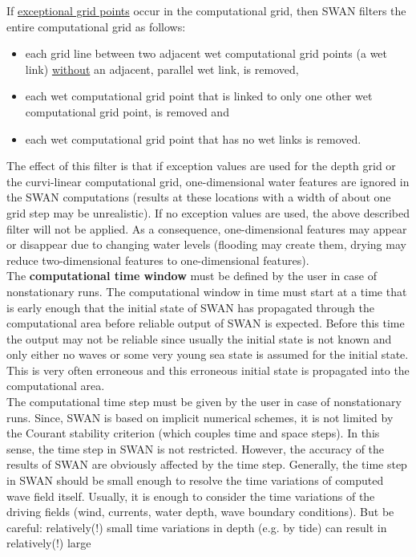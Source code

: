 \documentclass[12pt]{book}
\begin{document}
If \underline{exceptional grid points} occur in the computational grid, then SWAN filters the entire computational grid
as follows:
\begin{itemize}
  \item each grid line between two adjacent wet computational grid points (a wet link) \underline{without} an
        adjacent, parallel wet link, is removed,
  \item each wet computational grid point that is linked to only one other wet computational grid point,
        is removed and
  \item each wet computational grid point that has no wet links is removed.
\end{itemize}
The effect of this filter is that if exception values are used for the depth grid or the curvi-linear
computational grid, one-dimensional water features are ignored in the SWAN computations (results at
these locations with a width of about one grid step may be unrealistic). If no exception values are used,
the above described filter will not be applied. As a consequence, one-dimensional features may appear
or disappear due to changing water levels (flooding may create them, drying may reduce two-dimensional
features to one-dimensional features).
\\[2ex]
\noindent
The {\bf computational time window} must be defined by the user in case of nonstationary runs. The
computational window in time must start at a time that is early enough that the initial state of SWAN has
propagated through the computational area before reliable output of SWAN is expected. Before this time
the output may not be reliable since usually the initial state is not known and only either no waves or some
very young sea state is assumed for the initial state. This is very often erroneous and this erroneous initial
state is propagated into the computational area.
\\[2ex]
\noindent
The computational time step must be given by the user in case of nonstationary runs. Since, SWAN is
based on implicit numerical schemes, it is not limited by the Courant stability criterion (which couples
time and space steps). In this sense, the time step in SWAN is not restricted. However, the accuracy of
the results of SWAN are obviously affected by the time step. Generally, the time step in SWAN should be
small enough to resolve the time variations of computed wave field itself. Usually, it is enough to consider
the time variations of the driving fields (wind, currents, water depth, wave boundary conditions). But be
careful: relatively(!) small time variations in depth (e.g. by tide) can result in relatively(!) large
\end{document}
